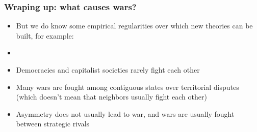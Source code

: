 \documentclass[aspectratio=43]{beamer}
\begin{document}
\begin{frame}
\frametitle{Wraping up: what causes wars?}
\centering

\begin{itemize}
\item<1-> But we do know some empirical regularities over which new theories can be built, for example:
\item[]
\item<2-> Democracies and capitalist societies rarely fight each other
\item<3-> Many wars are fought among contiguous states over territorial disputes (which doesn't mean that neighbors usually fight each other)
\item<4-> Asymmetry does not usually lead to war, and wars are usually fought between strategic rivals
\end{itemize}

\end{frame}

%
%

%
\end{document}
